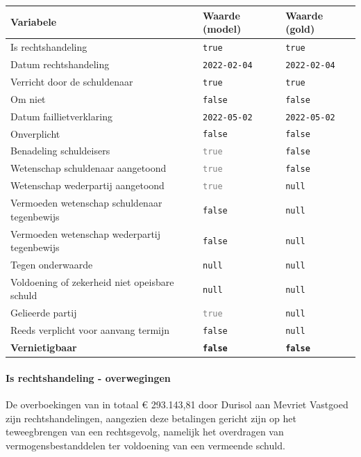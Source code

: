 \documentclass[
  dutch,
  a4paper,
]{article}
\begin{document}
\begin{center}
\small
\begin{tabular}{@{}p{7.4cm}p{2.6cm}p{2.6cm}@{}}
\toprule
Variabele & Waarde (model) & Waarde (gold) \\
\midrule
Is rechtshandeling & \texttt{true} & \texttt{true} \\
Datum rechtshandeling & \texttt{2022-02-04} & \texttt{2022-02-04} \\
Verricht door de schuldenaar & \texttt{true} & \texttt{true} \\
Om niet & \texttt{false} & \texttt{false} \\
Datum faillietverklaring & \texttt{2022-05-02} & \texttt{2022-05-02} \\
Onverplicht & \texttt{false} & \texttt{false} \\
Benadeling schuldeisers & \textcolor{gray}{\texttt{true}} & \texttt{false} \\
Wetenschap schuldenaar aangetoond & \textcolor{gray}{\texttt{true}} & \texttt{false} \\
Wetenschap wederpartij aangetoond & \textcolor{gray}{\texttt{true}} & \texttt{null} \\
Vermoeden wetenschap schuldenaar tegenbewijs & \texttt{false} & \texttt{null} \\
Vermoeden wetenschap wederpartij tegenbewijs & \texttt{false} & \texttt{null} \\
Tegen onderwaarde & \texttt{null} & \texttt{null} \\
Voldoening of zekerheid niet opeisbare schuld & \texttt{null} & \texttt{null} \\
Gelieerde partij & \textcolor{gray}{\texttt{true}} & \texttt{null} \\
Reeds verplicht voor aanvang termijn & \texttt{false} & \texttt{null} \\
\textbf{Vernietigbaar} & \textbf{\texttt{false}} & \textbf{\texttt{false}} \\
\bottomrule
\end{tabular}
\end{center}

\paragraph{Is rechtshandeling - overwegingen}\label{is-rechtshandeling---overwegingen-14}

De overboekingen van in totaal € 293.143,81 door Durisol aan Mevriet Vastgoed zijn rechtshandelingen, aangezien deze betalingen gericht zijn op het teweegbrengen van een rechtsgevolg, namelijk het overdragen van vermogensbestanddelen ter voldoening van een vermeende schuld.
\end{document}
